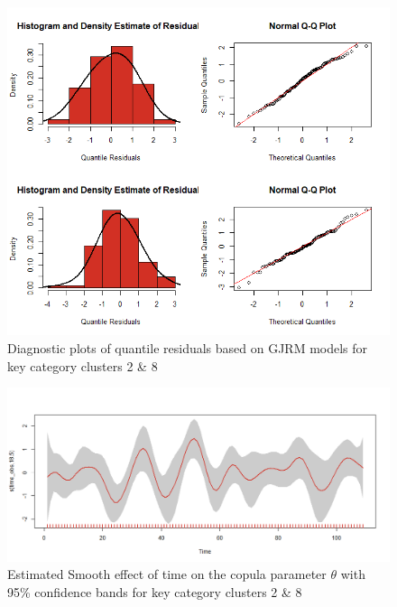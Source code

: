




\begin{figure}[H]
\centering
  \includegraphics[width=0.95\linewidth]{figures/res_hist_qqplot_28.png}
  \caption{Diagnostic plots of quantile residuals based on \ac{GJRM} models for key category clusters 2 \& 8}
  \label{fig:res_hist_qqplot_28}
\end{figure}


\begin{figure}[H]
\centering
  \includegraphics[width=0.95\linewidth]{figures/time_effect_on_theta_28.png}
  \caption{Estimated Smooth effect of time on the copula parameter $\theta$ with 95\% confidence bands for key category clusters 2 \& 8}
  \label{fig:time_effect_on_theta_28}
\end{figure}


